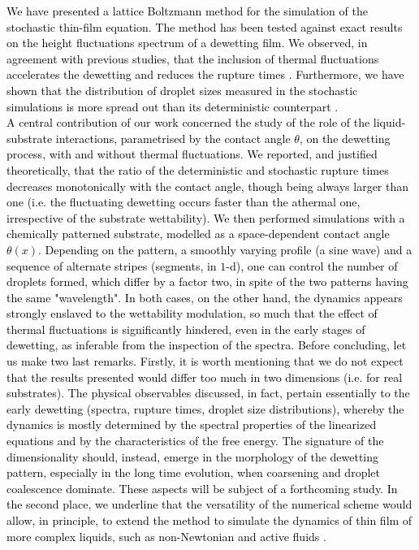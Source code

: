 \textcolor{black}{We have presented a lattice Boltzmann method for the simulation of the stochastic thin-film equation. 
The method has been tested against exact results on the height fluctuations spectrum of a dewetting film.  
We observed, in agreement with previous studies, that the inclusion of thermal fluctuations accelerates the dewetting and reduces 
the rupture times \cite{Grun2006}.
Furthermore, we have shown that the distribution of droplet sizes measured in the stochastic simulations 
is more spread out than its deterministic counterpart \cite{PhysRevE.92.061002}. \\
A central contribution of our work concerned the study of the role of the liquid-substrate interactions, parametrised by the contact angle $\theta$, on the dewetting process, with and without thermal fluctuations.}
\textcolor{black}{We reported, and justified theoretically, that the ratio of the deterministic and stochastic rupture times
decreases monotonically with the contact angle, though being always larger than one
(i.e. the fluctuating dewetting occurs faster than the athermal one, irrespective of the substrate wettability).  
We then performed simulations with a chemically patterned substrate, modelled as a space-dependent contact angle $\theta(x)$. 
Depending on the pattern, a smoothly varying profile (a sine wave) and a sequence of
alternate stripes (segments, in $1$-d), one can control the number of droplets formed,
which differ by a factor two, in spite of the two patterns having the same "wavelength".
In both cases, on the other hand, the dynamics appears strongly enslaved to the wettability 
modulation, so much that the effect of thermal fluctuations is significantly hindered, 
even in the early stages of dewetting, as inferable from the inspection of the spectra.
Before concluding, let us make two last remarks. Firstly, it is worth mentioning that we do not 
expect that the results presented would differ too much in two dimensions (i.e. for real substrates).
The physical observables discussed, in fact, pertain essentially to the early dewetting (spectra, rupture times, droplet size distributions),
whereby the dynamics is mostly determined by the spectral properties of the linearized equations and by the characteristics of the free energy.
The signature of the dimensionality should, instead, emerge in the morphology of the dewetting pattern, especially in the long time evolution,
when coarsening and droplet coalescence dominate. These aspects will be subject of a forthcoming study. 
In the second place, we underline that the versatility of the numerical scheme would allow, in principle, to extend the method to simulate
the dynamics of thin film of more complex liquids, such as non-Newtonian and active fluids \cite{Eggers1997,Carenza2019}.
}

